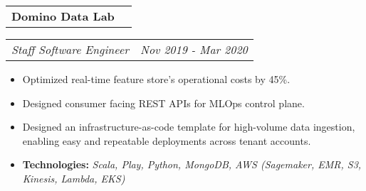 \documentclass[a4paper,11pt]{article}
\makeatletter
\newcommand{\resitem}[1]{\item #1}
\newcommand{\resCompany}[1]{
    \begin{tabular*}{\textwidth}{l @{\extracolsep{\fill}} r}
    \large \textbf{#1}
  \end{tabular*}
}
\newcommand{\resPosition}[2]{
    \begin{tabular*}{\textwidth}{l @{\extracolsep{\fill}} r}
        \textit{#1} & \textit{#2}
    \end{tabular*}
}
\makeatother
\begin{document}
\pagebreak
    \indent \resCompany{Domino Data Lab}
        \indent \resPosition{Staff Software Engineer}{Nov 2019 - Mar 2020}
        \begin{itemize}[leftmargin=30pt, rightmargin=-16pt, itemsep=-2pt]
            \setlength{\itemsep}{-3pt}
            
            \resitem{Optimized real-time feature store's operational costs by 45\%.}
            \resitem{Designed consumer facing REST APIs for MLOps control plane.}
            \resitem{Designed an infrastructure-as-code template for high-volume data ingestion, enabling easy and repeatable deployments across tenant accounts.}

            \resitem{\textbf{Technologies:} \textit{Scala, Play, Python, MongoDB, AWS (Sagemaker, EMR, S3, Kinesis, Lambda, EKS)}}
            
        \end{itemize}
\end{document}
